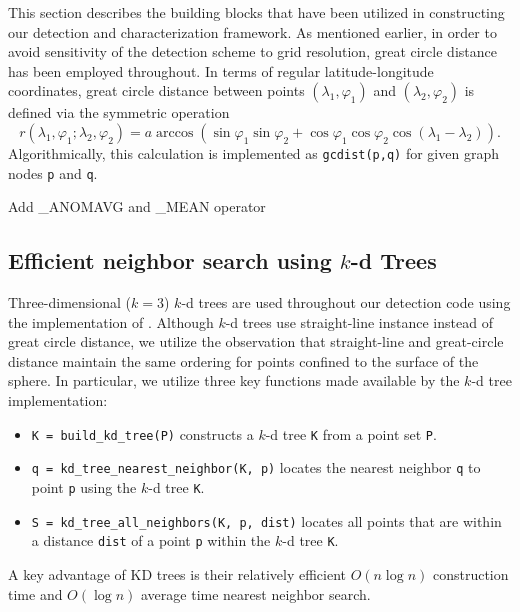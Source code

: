 \documentclass[gmdd, hvmath, online]{copernicus_discussions}
\begin{document}
This section describes the building blocks that have been utilized in constructing our detection and characterization framework.  As mentioned earlier, in order to avoid sensitivity of the detection scheme to grid resolution, great circle distance has been employed throughout.  In terms of regular latitude-longitude coordinates, great circle distance between points $(\lambda_1, \varphi_1)$ and $(\lambda_2, \varphi_2)$ is defined via the symmetric operation
\begin{equation}
r(\lambda_1, \varphi_1; \lambda_2, \varphi_2) = a \arccos \left( \sin \varphi_1 \sin \varphi_2 + \cos \varphi_1 \cos \varphi_2 \cos (\lambda_1 - \lambda_2) \right).
\end{equation}  Algorithmically, this calculation is implemented as \texttt{gcdist(p,q)} for given graph nodes \texttt{p} and \texttt{q}.

{\color{red}Add \_ANOMAVG and \_MEAN operator}

\subsection{Efficient neighbor search using $k$-d Trees}

Three-dimensional ($k=3$) $k$-d trees \citep{bentley1975multidimensional} are used throughout our detection code using the implementation of \cite{tsiombikas2015kdtree}.  Although $k$-d trees use straight-line instance instead of great circle distance, we utilize the observation that straight-line and great-circle distance maintain the same ordering for points confined to the surface of the sphere.  In particular, we utilize three key functions made available by the $k$-d tree implementation:
\begin{itemize}
\item[] \texttt{K = build\_kd\_tree(P)} constructs a $k$-d tree \texttt{K} from a point set \texttt{P}.
\item[] \texttt{q = kd\_tree\_nearest\_neighbor(K, p)} locates the nearest neighbor \texttt{q} to point \texttt{p} using the $k$-d tree \texttt{K}.
\item[] \texttt{S = kd\_tree\_all\_neighbors(K, p, dist)} locates all points that are within a distance \texttt{dist} of a point \texttt{p} within the $k$-d tree \texttt{K}.
\end{itemize}

\noindent A key advantage of KD trees is their relatively efficient $O(n \log n)$ construction time and $O(\log n)$ average time nearest neighbor search.
\end{document}
